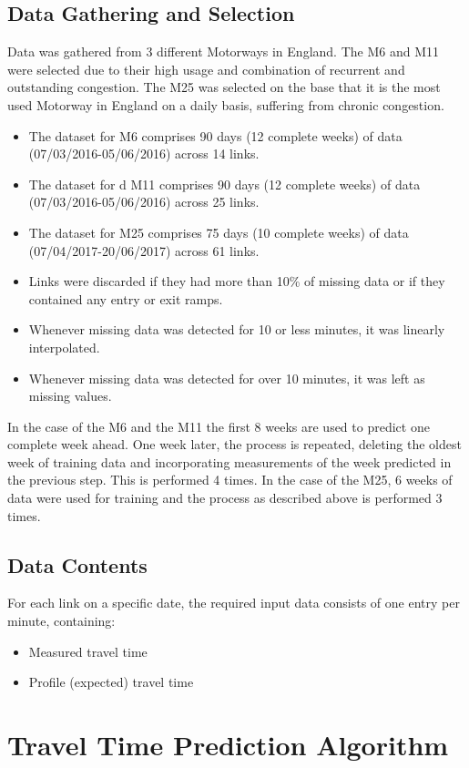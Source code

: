 \documentclass[conference, letterpaper]{IEEEtran}
\begin{document}
\subsection{Data Gathering and Selection}
Data was gathered from 3 different Motorways in England.
The M6 and M11 were selected due to their high usage and combination of recurrent and outstanding congestion. 
The M25 was selected on the base that it is the most used Motorway in England on a daily basis, suffering from chronic congestion.
\begin{itemize}
	\item The dataset for M6 comprises 90 days (12 complete weeks) of data (07/03/2016-05/06/2016) across 14 links.
	\item The dataset for d M11 comprises 90 days (12 complete weeks) of data (07/03/2016-05/06/2016) across 25 links.
	\item The dataset for M25 comprises 75 days (10 complete weeks) of data (07/04/2017-20/06/2017) across 61 links.
	\item Links were discarded if they had more than 10\% of missing data or if they contained any entry or exit ramps.
	\item Whenever missing data was detected for 10 or less minutes, it was linearly interpolated.
	\item Whenever missing data was detected for over 10 minutes, it was left as missing values.
\end{itemize}
In the case of the M6 and the M11 the first 8 weeks are used to predict one complete week ahead.
One week later, the process is repeated, deleting the oldest week of training data and incorporating measurements of the week predicted in the previous step. This is performed 4 times.
In the case of the M25, 6 weeks of data were used for training and the process as described above is performed 3 times.
\subsection{Data Contents}
For each link on a specific date, the required input data consists of one entry per minute, containing:
\begin{itemize}
	\item Measured travel time
	\item Profile (expected) travel time 	
\end{itemize}
\section{Travel Time Prediction Algorithm} \label{algorithm}
\end{document}
